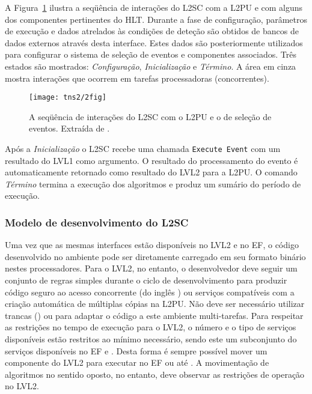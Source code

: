 A Figura~\ref{fig:l2sc-interaction} ilustra a seqüência de interações do L2SC
com a L2PU e com alguns dos componentes pertinentes do HLT. Durante a fase de
configuração, parâmetros de execução e dados atrelados às condições de deteção
são obtidos de bancos de dados externos através desta interface. Estes dados
são posteriormente utilizados para configurar o sistema de seleção de eventos
e componentes associados. Três estados são mostrados: \textit{Configuração},
\textit{Inicialização} e \textit{Término}. A área em cinza mostra interações
que ocorrem em tarefas processadoras (concorrentes).

\begin{figure}
\begin{center}
\texttt{[image: tns2/2fig]}
\end{center}
\caption{A seqüência de interações do L2SC com o L2PU e o  de
seleção de eventos. Extraída de \cite{aa:tns-2004-2}.}
\label{fig:l2sc-interaction}
\end{figure}

Após a \textit{Inicialização} o L2SC recebe uma chamada \texttt{Execute Event}
com um resultado do LVL1 como argumento. O resultado do processamento do
evento é automaticamente retornado como resultado do LVL2 para a L2PU. O
comando \textit{Término} termina a execução dos algoritmos e produz um sumário
do período de execução.

\subsubsection{Modelo de desenvolvimento do L2SC}

Uma vez que as mesmas interfaces estão disponíveis no LVL2 e no EF, o código
desenvolvido no ambiente  pode ser diretamente carregado em seu
formato binário nestes processadores. Para o LVL2, no entanto, o desenvolvedor
deve seguir um conjunto de regras simples \cite{aa:lvl2-coding} durante o
ciclo de desenvolvimento para produzir código seguro ao acesso concorrente (do
inglês ) ou serviços compatíveis com a criação automática de
múltiplas cópias na L2PU. Não deve ser necessário utilizar trancas
() ou  para adaptar o código a este ambiente
multi-tarefas. Para respeitar as restrições no tempo de execução para o LVL2, o
número e o tipo de serviços disponíveis estão restritos ao mínimo necessário,
sendo este um subconjunto do serviços disponíveis no EF e . Desta
forma é sempre possível mover um componente do LVL2 para executar no EF ou até
. A movimentação de algoritmos no sentido oposto, no entanto,
deve observar as restrições de operação no LVL2.

